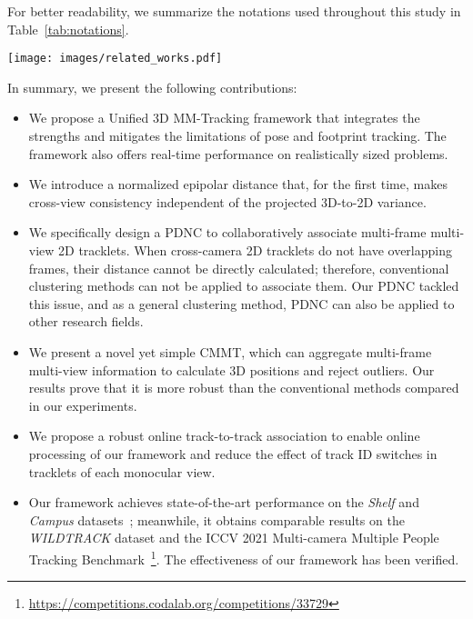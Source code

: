 \documentclass{CVM}
\begin{document}
For better readability, we summarize the notations used throughout this study in Table~\ref{tab:notations}.

\begin{figure*}[!h]
  \centering
  \texttt{[image: images/related\_works.pdf]}
  \captionsetup{font=small}
  \caption{\textbf{Two types of 3D MM-Tracking architectures that are related to our work.} Type (1)~\cite{sternig2011multi,wen2017multi,kohl2020mta, he2020multi} generates 2D tracklets for each view and the corresponding 3D positions are directly obtained with homography projection, which requires 3D positions on the ground plane. Then, it merges 3D tracklets projected from each view in an \textit{offline} manner. Type (2)~\cite{chen2020multi,chen2020cross,ohashi20vmocap,dong2021fast} first applies single-frame multi-view association and triangulation to obtain 3D positions, and then links 3D positions into 3D tracklets in an \textit{online} manner.}
  \label{fig:related_works}
\end{figure*}

In summary, we present the following contributions:
\begin{itemize}[noitemsep]
  \item We propose a Unified 3D MM-Tracking framework that integrates the strengths and mitigates the limitations of pose and footprint tracking. The framework also offers real-time performance on realistically sized problems.
  \item We introduce a normalized epipolar distance that, for the first time, makes cross-view consistency independent of the projected 3D-to-2D variance.
  \item We specifically design a PDNC to collaboratively associate multi-frame multi-view 2D tracklets. When cross-camera 2D tracklets do not have overlapping frames, their distance cannot be directly calculated; therefore, conventional clustering methods can not be applied to associate them. Our PDNC tackled this issue, and as a general clustering method, PDNC can also be applied to other research fields. 
  \item We present a novel yet simple CMMT, which can aggregate multi-frame multi-view information to calculate 3D positions and reject outliers. Our results prove that it is more robust than the conventional methods compared in our experiments.
  \item We propose a robust online track-to-track association to enable online processing of our framework and reduce the effect of track ID switches in tracklets of each monocular view.
  \item Our framework achieves state-of-the-art performance on the \textit{Shelf} and \textit{Campus} datasets~\cite{fleuret2007multicamera,BelagiannisAASN16}; meanwhile, it obtains comparable results on the \textit{WILDTRACK} dataset and the ICCV 2021 Multi-camera Multiple People Tracking Benchmark~\footnote{\url{https://competitions.codalab.org/competitions/33729}}. The effectiveness of our framework has been verified.
\end{itemize}
\end{document}
